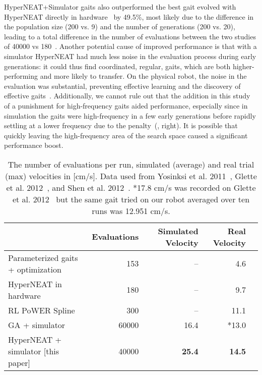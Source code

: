 HyperNEAT+Simulator gaits also outperformed the best gait evolved with HyperNEAT directly in hardware~\cite{yos:clune} by 49.5\%, most likely due to the difference in the population size (200 vs. 9) and the number of generations (200 vs. 20), leading to a total difference in the number of evaluations between the two studies of 40000 vs 180~\cite{yos:clune}. Another potential cause of improved performance is that with a simulator HyperNEAT had much less noise in the evaluation process during early generations: it could thus find coordinated, regular, gaits, which are both higher-performing and more likely to transfer. On the physical robot, the noise in the evaluation was substantial, preventing effective learning and the discovery of effective gaits~\cite{yos:clune}. Additionally, we cannot rule out that the addition in this study of a punishment for high-frequency gaits aided performance, especially since in simulation the gaits were high-frequency in a few early generations before rapidly settling at a lower frequency due to the penalty~(, right). It is possible that quickly leaving the high-frequency area of the search space caused a significant performance boost. 

\begin{table}
\caption{The number of evaluations per run, simulated (average) and real trial (max) velocities in [cm/s]. Data used from Yosinksi et al. 2011~\cite{yos:clune}, Glette et al. 2012~\cite{glette}, and Shen et al. 2012~\cite{haocheng}.
*17.8 cm/s was recorded on Glette et al. 2012~\cite{glette} but the same gait tried on our robot averaged over ten runs was 12.951 cm/s.}  %
\begin{center}
\begin{tabular}{|l|r|r|r|r|}
\hline
                                         & Evaluations  & Simulated Velocity  & Real Velocity \\
\hline
Parameterized gaits + optimization \cite{yos:clune}   &153    & --    & 4.6 \\
\hline
HyperNEAT in hardware \cite{yos:clune}                 & 180         & --         &   9.7     \\
\hline
RL PoWER Spline \cite{haocheng}                         & 300         & --         &   11.1 \\
\hline
GA + simulator \cite{glette}             & 60000       & 16.4       &   *13.0     \\
\hline
HyperNEAT + simulator [this paper]                     & 40000       & \textbf{25.4}       &   \textbf{14.5} \\
\hline
\end{tabular}
\end{center}
\label{resultsTable}
\end{table}

